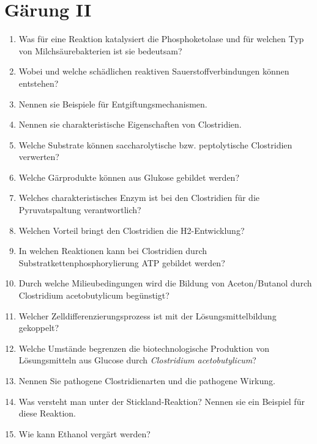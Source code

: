 
\section{Gärung II}
\begin{enumerate}
	\item Was für eine Reaktion katalysiert die Phosphoketolase und für welchen Typ von Milchsäurebakterien ist sie bedeutsam?
	\item Wobei und welche schädlichen reaktiven Sauerstoffverbindungen können entstehen?
	\item Nennen sie Beispiele für Entgiftungsmechanismen.
	\item Nennen sie charakteristische Eigenschaften von Clostridien.
	\item Welche Substrate können saccharolytische bzw. peptolytische Clostridien verwerten?
	\item Welche Gärprodukte können aus Glukose gebildet werden?
	\item Welches charakteristisches Enzym ist bei den Clostridien für die Pyruvatspaltung verantwortlich?
	\item Welchen Vorteil bringt den Clostridien die H2-Entwicklung?
	\item In welchen Reaktionen kann bei Clostridien durch Substratkettenphosphorylierung ATP gebildet werden?
	\item Durch welche Milieubedingungen wird die Bildung von Aceton/Butanol durch Clostridium acetobutylicum begünstigt?
	\item Welcher Zelldifferenzierungsprozess ist mit der Lösungsmittelbildung gekoppelt?
	\item Welche Umstände begrenzen die biotechnologische Produktion von Lösungsmitteln aus Glucose durch \emph{Clostridium acetobutylicum}?
	\item Nennen Sie pathogene Clostridienarten und die pathogene Wirkung.
	\item Was versteht man unter der Stickland-Reaktion? Nennen sie ein Beispiel für diese Reaktion.
	\item Wie kann Ethanol vergärt werden?
\end{enumerate}
